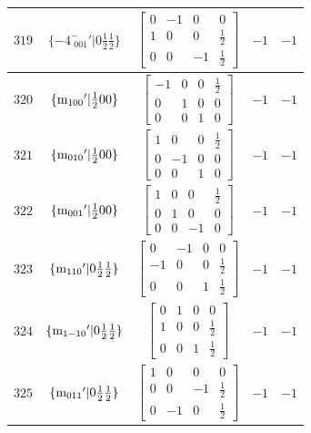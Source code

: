 \documentclass[fleqn,8pt]{jsarticle}
\begin{document}
\begin{longtable}{ccccc}
$ 319 $ & $ \{-4^{-}_{\,\,001}{}'|0 \frac{1}{2} \frac{1}{2}\} $ & $ \begin{bmatrix} 0 & -1 & 0 & 0 \\ 1 & 0 & 0 & \frac{1}{2} \\ 0 & 0 & -1 & \frac{1}{2} \end{bmatrix} $ & $ -1 $ & $ -1 $ \\ \hline
$ 320 $ & $ \{{\rm m}_{100}{}'|\frac{1}{2} 0 0\} $ & $ \begin{bmatrix} -1 & 0 & 0 & \frac{1}{2} \\ 0 & 1 & 0 & 0 \\ 0 & 0 & 1 & 0 \end{bmatrix} $ & $ -1 $ & $ -1 $ \\ \hline
$ 321 $ & $ \{{\rm m}_{010}{}'|\frac{1}{2} 0 0\} $ & $ \begin{bmatrix} 1 & 0 & 0 & \frac{1}{2} \\ 0 & -1 & 0 & 0 \\ 0 & 0 & 1 & 0 \end{bmatrix} $ & $ -1 $ & $ -1 $ \\ \hline
$ 322 $ & $ \{{\rm m}_{001}{}'|\frac{1}{2} 0 0\} $ & $ \begin{bmatrix} 1 & 0 & 0 & \frac{1}{2} \\ 0 & 1 & 0 & 0 \\ 0 & 0 & -1 & 0 \end{bmatrix} $ & $ -1 $ & $ -1 $ \\ \hline
$ 323 $ & $ \{{\rm m}_{110}{}'|0 \frac{1}{2} \frac{1}{2}\} $ & $ \begin{bmatrix} 0 & -1 & 0 & 0 \\ -1 & 0 & 0 & \frac{1}{2} \\ 0 & 0 & 1 & \frac{1}{2} \end{bmatrix} $ & $ -1 $ & $ -1 $ \\ \hline
$ 324 $ & $ \{{\rm m}_{1-10}{}'|0 \frac{1}{2} \frac{1}{2}\} $ & $ \begin{bmatrix} 0 & 1 & 0 & 0 \\ 1 & 0 & 0 & \frac{1}{2} \\ 0 & 0 & 1 & \frac{1}{2} \end{bmatrix} $ & $ -1 $ & $ -1 $ \\ \hline
$ 325 $ & $ \{{\rm m}_{011}{}'|0 \frac{1}{2} \frac{1}{2}\} $ & $ \begin{bmatrix} 1 & 0 & 0 & 0 \\ 0 & 0 & -1 & \frac{1}{2} \\ 0 & -1 & 0 & \frac{1}{2} \end{bmatrix} $ & $ -1 $ & $ -1 $ \\ \hline

\end{longtable}
\end{document}
